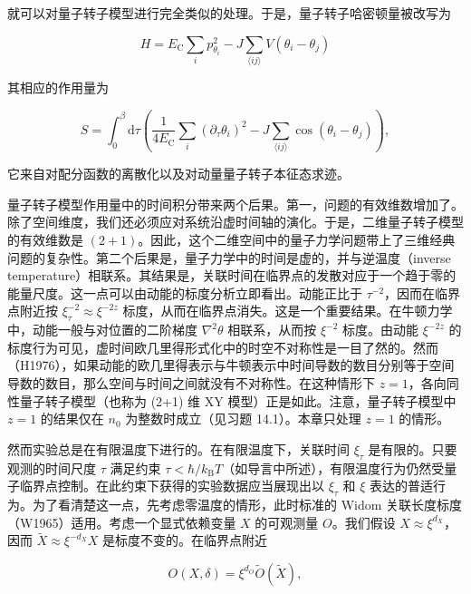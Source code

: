就可以对量子转子模型进行完全类似的处理。于是，量子转子哈密顿量被改写为

\begin{equation*}
H = E_{\mathrm{C}} \sum_i p_{\theta_i}^2 - J \sum_{\langle ij\rangle} V(\theta_i - \theta_j)\tag{14.11}
\end{equation*}

其相应的作用量为

\begin{equation*}
S = \int_0^{\beta} \mathrm{d}\tau \left( \frac{1}{4E_{\mathrm{C}}} \sum_i (\partial_{\tau}\theta_i)^2 - J \sum_{\langle ij\rangle} \cos(\theta_i - \theta_j) \right),\tag{14.12}
\end{equation*}

它来自对配分函数的离散化以及对动量量子转子本征态求迹。

量子转子模型作用量中的时间积分带来两个后果。第一，问题的有效维数增加了。除了空间维度，我们还必须应对系统沿虚时间轴的演化。于是，二维量子转子模型的有效维数是 $(2+1)$。因此，这个二维空间中的量子力学问题带上了三维经典问题的复杂性。第二个后果是，量子力学中的时间是虚的，并与逆温度（inverse temperature）相联系。其结果是，关联时间在临界点的发散对应于一个趋于零的能量尺度。这一点可以由动能的标度分析立即看出。动能正比于 $\tau^{-2}$，因而在临界点附近按 $\xi_{\tau}^{-2}\approx\xi^{-2z}$ 标度，从而在临界点消失。这是一个重要结果。在牛顿力学中，动能一般与对位置的二阶梯度 $\nabla^2\theta$ 相联系，从而按 $\xi^{-2}$ 标度。由动能 $\xi^{-2z}$ 的标度行为可见，虚时间欧几里得形式化中的时空不对称性是一目了然的。然而（H1976），如果动能的欧几里得表示与牛顿表示中时间导数的数目分别等于空间导数的数目，那么空间与时间之间就没有不对称性。在这种情形下 $z=1$，各向同性量子转子模型（也称为 (2+1) 维 XY 模型）正是如此。注意，量子转子模型中 $z=1$ 的结果仅在 $n_0$ 为整数时成立（见习题 14.1）。本章只处理 $z=1$ 的情形。

然而实验总是在有限温度下进行的。在有限温度下，关联时间 $\xi_{\tau}$ 是有限的。只要观测的时间尺度 $\tau$ 满足约束 $\tau<\hbar/k_{\mathrm{B}}T$（如导言中所述），有限温度行为仍然受量子临界点控制。在此约束下获得的实验数据应当展现出以 $\xi_{\tau}$ 和 $\xi$ 表达的普适行为。为了看清楚这一点，先考虑零温度的情形，此时标准的 Widom 关联长度标度（W1965）适用。考虑一个显式依赖变量 $X$ 的可观测量 $O$。我们假设 $X\approx\xi^{d_X}$，因而 $\tilde{X}\approx\xi^{-d_X}X$ 是标度不变的。在临界点附近

\begin{equation*}
O(X,\delta) = \xi^{d_O} \tilde{O}(\tilde{X}),\tag{14.13}
\end{equation*}

